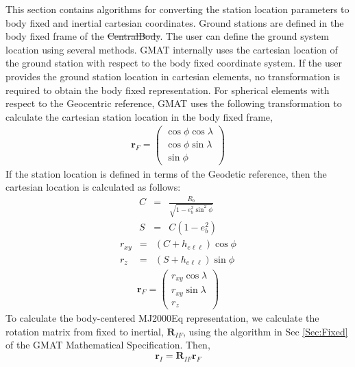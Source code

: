 This section contains algorithms for converting the station location
parameters to body fixed and inertial cartesian coordinates. Ground
stations are defined in the body fixed frame of the
\st{CentralBody}. The user can define the ground system location
using several methods.  GMAT internally uses the cartesian location
of the ground station with respect to the body fixed coordinate
system. If the user provides the ground station location in
cartesian elements, no transformation is required to obtain the body
fixed representation. For spherical elements with respect to the
Geocentric reference, GMAT uses the following transformation to
calculate the cartesian station location in the body fixed frame,
%
\begin{eqnarray}
    \mathbf{r}_F = \left(
        \begin{array}{cc}
          \cos{\phi}\cos{\lambda}\\
          \cos{\phi}\sin{\lambda}\\
          \sin{\phi}
          \end{array}
          \right)
\end{eqnarray}
%
If the station location is defined in terms of the Geodetic
reference, then the cartesian location is calculated as
follows\cite{Vallado}:
%
\begin{eqnarray}
    C &=& \displaystyle\frac{R_b}{\sqrt{1 - e_b^2\sin^2{\phi}}}\\
%
    S &=& C\left(1 - e_b^2\right)
\end{eqnarray}
%
\begin{eqnarray}
    r_{xy} &=& \left( C + h_{e\ell\ell}\right)\cos{\phi}\\
%
    r_{z} &=& \left( S + h_{e\ell\ell}\right)\sin{\phi}
\end{eqnarray}
%
\begin{eqnarray}
    \mathbf{r}_F = \left(
        \begin{array}{cc}
          r_{xy}\cos{\lambda}\\
          r_{xy}\sin{\lambda}\\
          r_{z}
          \end{array}
          \right)
\end{eqnarray}
%
To calculate the body-centered MJ2000Eq representation, we calculate
the rotation matrix from fixed to inertial, $\mathbf{R}_{IF}$, using
the algorithm in Sec \ref{Sec:Fixed} of the GMAT Mathematical
Specification. Then,
%
\begin{equation}
    \mathbf{r}_I = \mathbf{R}_{IF}\mathbf{r}_F
\end{equation}
